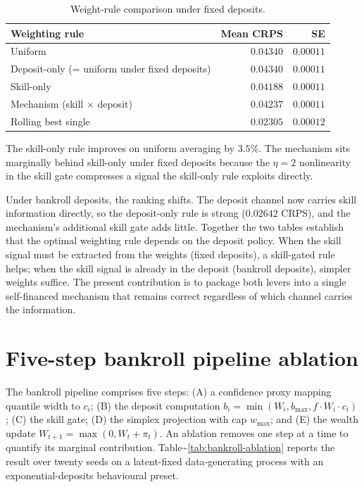 \documentclass[
  11pt,
  a4paper,
  oneside]{report}
\begin{document}
\begin{table}[h]
\centering
\small
\begin{tabular}{lrr}
\toprule
Weighting rule & Mean CRPS & SE \\
\midrule
Uniform & $0.04340$ & $0.00011$ \\
Deposit-only (= uniform under fixed deposits)
  & $0.04340$ & $0.00011$ \\
Skill-only & $0.04188$ & $0.00011$ \\
Mechanism (skill $\times$ deposit) & $0.04237$ & $0.00011$ \\
Rolling best single & $0.02305$ & $0.00012$ \\
\bottomrule
\end{tabular}
\caption{Weight-rule comparison under fixed deposits.}
\label{tab:weight-rule-fixed}
\end{table}

The skill-only rule improves on uniform averaging by \(3.5\%\). The
mechanism sits marginally behind skill-only under fixed deposits because
the \(\eta = 2\) nonlinearity in the skill gate compresses a signal the
skill-only rule exploits directly.

Under bankroll deposits, the ranking shifts. The deposit channel now
carries skill information directly, so the deposit-only rule is strong
(\(0.02642\) CRPS), and the mechanism's additional skill gate adds
little. Together the two tables establish that the optimal weighting
rule depends on the deposit policy. When the skill signal must be
extracted from the weights (fixed deposits), a skill-gated rule helps;
when the skill signal is already in the deposit (bankroll deposits),
simpler weights suffice. The present contribution is to package both
levers into a single self-financed mechanism that remains correct
regardless of which channel carries the information.

\section{Five-step bankroll pipeline
ablation}\label{five-step-bankroll-pipeline-ablation}

The bankroll pipeline comprises five steps: (A) a confidence proxy
mapping quantile width to \(c_i\); (B) the deposit computation
\(b_i = \min(W_i, b_{\max}, f \cdot W_i \cdot c_i)\); (C) the skill
gate; (D) the simplex projection with cap \(w_{\max}\); and (E) the
wealth update \(W_{t+1} = \max(0, W_t + \pi_t)\). An ablation removes
one step at a time to quantify its marginal contribution.
Table\textasciitilde{}\ref{tab:bankroll-ablation} reports the result
over twenty seeds on a latent-fixed data-generating process with an
exponential-deposits behavioural preset.
\end{document}
